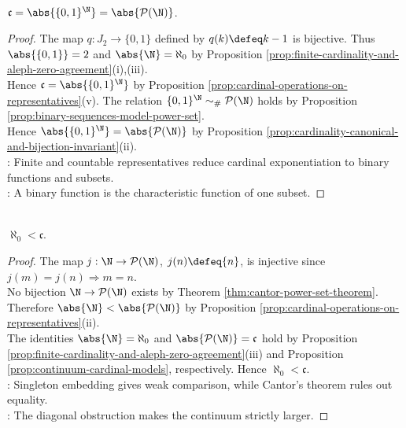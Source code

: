 \begin{proposition} \label{prop:continuum-cardinal-models} \\
$\mathfrak{c}=\abs{\{0,1\}^{\N}}=\abs{\mathcal{P}(\N)}$.
\begin{proof}
The map $q:J_2\to\{0,1\}$ defined by $q(k)\defeq k-1$ is bijective. Thus $\abs{\{0,1\}}=2$ and $\abs{\N}=\aleph_0$ by Proposition \ref{prop:finite-cardinality-and-aleph-zero-agreement}(i),(iii).\\
Hence $\mathfrak{c}=\abs{\{0,1\}^{\N}}$ by Proposition \ref{prop:cardinal-operations-on-representatives}(v). The relation $\{0,1\}^{\N}\sim_{\#}\mathcal{P}(\N)$ holds by Proposition \ref{prop:binary-sequences-model-power-set}.\\
Hence $\abs{\{0,1\}^{\N}}=\abs{\mathcal{P}(\N)}$ by Proposition \ref{prop:cardinality-canonical-and-bijection-invariant}(ii).\\
: Finite and countable representatives reduce cardinal exponentiation to binary functions and subsets.\\
: A binary function is the characteristic function of one subset.
\end{proof}
\end{proposition}

\begin{corollary} \label{cor:continuum-strictly-exceeds-aleph-zero} \\
$\aleph_0<\mathfrak{c}$.
\begin{proof}
The map $j:\N\to\mathcal{P}(\N)$, $j(n)\defeq\{n\}$, is injective since $j(m)=j(n)\Rightarrow m=n$.\\
No bijection $\N\to\mathcal{P}(\N)$ exists by Theorem \ref{thm:cantor-power-set-theorem}. Therefore $\abs{\N}<\abs{\mathcal{P}(\N)}$ by Proposition \ref{prop:cardinal-operations-on-representatives}(ii).\\
The identities $\abs{\N}=\aleph_0$ and $\abs{\mathcal{P}(\N)}=\mathfrak{c}$ hold by Proposition \ref{prop:finite-cardinality-and-aleph-zero-agreement}(iii) and Proposition \ref{prop:continuum-cardinal-models}, respectively. Hence $\aleph_0<\mathfrak{c}$.\\
: Singleton embedding gives weak comparison, while Cantor's theorem rules out equality.\\
: The diagonal obstruction makes the continuum strictly larger.
\end{proof}
\end{corollary}
